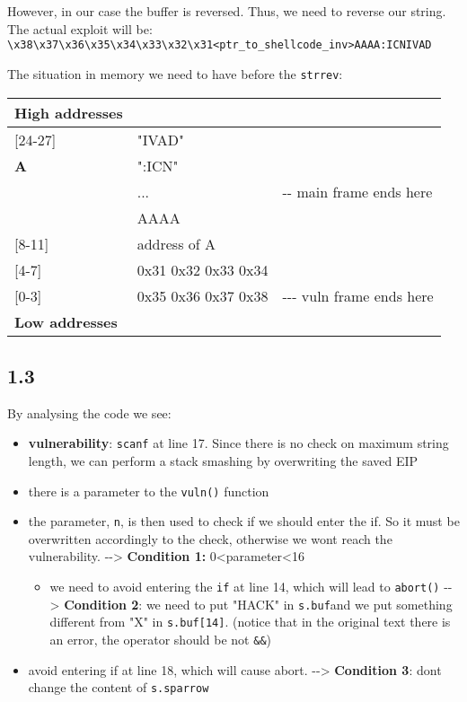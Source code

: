 \documentclass[
]{article}
\providecommand{\tightlist}{%
  \setlength{\itemsep}{0pt}\setlength{\parskip}{0pt}}
\begin{document}
However, in our case the buffer is reversed. Thus, we need to reverse
our string. The actual exploit will be:\\
\texttt{\textbackslash{}x38\textbackslash{}x37\textbackslash{}x36\textbackslash{}x35\textbackslash{}x34\textbackslash{}x33\textbackslash{}x32\textbackslash{}x31\textless{}ptr\_to\_shellcode\_inv\textgreater{}AAAA:ICNIVAD}

The situation in memory we need to have before the \texttt{strrev}:

\begin{longtable}[]{@{}lll@{}}
\toprule\noalign{}
High addresses & & \\
\midrule\noalign{}
\endhead
\bottomrule\noalign{}
\endlastfoot
{[}24-27{]} & "IVAD" & \\
\textbf{A} & ":ICN" & \\
& ... & -\/- main frame ends here \\
& AAAA & \\
{[}8-11{]} & address of A & \\
{[}4-7{]} & 0x31 0x32 0x33 0x34 & \\
{[}0-3{]} & 0x35 0x36 0x37 0x38 & -\/-\/- vuln frame ends here \\
\textbf{Low addresses} & & \\
\end{longtable}

\subsection{1.3}\label{section-2}

By analysing the code we see:

\begin{itemize}
\tightlist
\item
  \textbf{vulnerability}: \texttt{scanf} at line 17. Since there is no
  check on maximum string length, we can perform a stack smashing by
  overwriting the saved EIP
\item
  there is a parameter to the \texttt{vuln()} function
\item
  the parameter, \texttt{n}, is then used to check if we should enter
  the if. So it must be overwritten accordingly to the check, otherwise
  we won\textquotesingle t reach the vulnerability. -\/-\textgreater{}
  \textbf{Condition 1:} 0\textless parameter\textless16

  \begin{itemize}
  \tightlist
  \item
    we need to avoid entering the \texttt{if} at line 14, which will
    lead to \texttt{abort()} -\/-\textgreater{} \textbf{Condition 2}: we
    need to put "HACK" in \texttt{s.buf}and we put something different
    from "X" in \texttt{s.buf{[}14{]}}. (notice that in the original
    text there is an error, the operator should be
    \texttt{\textbar{}\textbar{}} not \texttt{\&\&})
  \end{itemize}
\item
  avoid entering if at line 18, which will cause abort.
  -\/-\textgreater{} \textbf{Condition 3}: don\textquotesingle t change
  the content of \texttt{s.sparrow}
\end{itemize}
\end{document}
